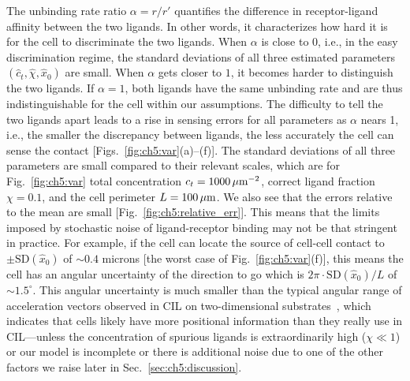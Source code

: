 The unbinding rate ratio $\alpha=r/r'$ quantifies the difference in receptor-ligand affinity between the two ligands.
In other words, it characterizes how hard it is for the cell to discriminate the two ligands.
When $\alpha$ is close to $0$, i.e., in the easy discrimination regime, the standard deviations of all three estimated parameters $(\hat{c}_t,\hat{\chi},\hat{x}_0)$ are small.
When $\alpha$ gets closer to $1$, it becomes harder to distinguish the two ligands.
If $\alpha=1$, both ligands have the same unbinding rate and are thus indistinguishable for the cell within our assumptions.
The difficulty to tell the two ligands apart leads to a rise in sensing errors for all parameters as $\alpha$ nears 1, i.e., the smaller the discrepancy between ligands, the less accurately the cell can sense the contact [Figs.~\ref{fig:ch5:var}(a)--(f)].
The standard deviations of all three parameters are small compared to their relevant scales, which are for Fig.~\ref{fig:ch5:var} total concentration $c_t=1000\,\rm{\mu m^{-2}}$, correct ligand fraction $\chi=0.1$, and the cell perimeter $L=100\,\rm{\mu m}$.
We also see that the errors relative to the mean are small [Fig.~\ref{fig:ch5:relative_err}].
This means that the limits imposed by stochastic noise of ligand-receptor binding may not be that stringent in practice.
For example, if the cell can locate the source of cell-cell contact to $\pm \textrm{SD}(\hat{x}_0)$ of $\sim0.4$ microns [the worst case of Fig.~\ref{fig:ch5:var}(f)], this means the cell has an angular uncertainty of the direction to go which is $2\pi\cdot\textrm{SD}(\hat{x}_0)/L$ of $\sim 1.5^\circ$.
This angular uncertainty is much smaller than the typical angular range of acceleration vectors observed in CIL on two-dimensional substrates~\cite{davis2012emergence}, which indicates that cells likely have more positional information than they really use in CIL---unless the concentration of spurious ligands is extraordinarily high ($\chi \ll 1$) or our model is incomplete or there is additional noise due to one of the other factors we raise later in Sec.~\ref{sec:ch5:discussion}.

